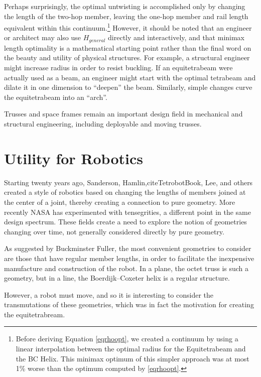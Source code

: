 \documentclass[11pt]{article}
\begin{document}
Perhaps surprisingly, the optimal untwisting is accomplished only by
changing the length of the two-hop member, leaving the one-hop member
and rail length equivalent within this continuum.\footnote{Before deriving Equation \eqref{eqrhoopt}, we created a continuum by
using a linear interpolation between the optimal radius for the
Equitetrabeam and the BC Helix. This minimax optimum of this simpler
approach was at most 1\% worse than the optimum computed by
\eqref{eqrhoopt}.}
 However, it should
be noted that an engineer or architect may also use $H_{general}$
directly and interactively, and that minimax length optimality is a
mathematical starting point rather than the final word on the beauty and utility of
physical structures. For example, a structural engineer might increase
radius in order to resist buckling. If an equitetrabeam were actually
used as a beam, an engineer might start with the optimal tetrabeam and
dilate it in one dimension to ``deepen'' the beam. Similarly, simple
changes curve the equitetrabeam into an ``arch''.

Trusses and space frames remain an important design field in
mechanical and structural engineering\cite{mikulas1985sequentially},
including deployable and moving trusses\cite{claypool2012readily}.


\section{Utility for Robotics}

Starting twenty years ago, Sanderson\cite{sanderson1996modular},
Hamlin,cite{TetrobotBook}, Lee\cite{lee2002dynamic}, and others
 created a style of robotics based on changing
the lengths of members joined at the center of a joint, thereby
creating a connection to pure geometry. More recently NASA has
experimented with tensegrities\cite{NTRT}, a different point in the
same design spectrum. These fields create a need to explore the notion
of geometries changing over time, not generally considered directly by
pure geometry.

As suggested by Buckminster Fuller, the most convenient geometries to
consider are those that have regular member lengths, in order to
facilitate the inexpensive manufacture and construction of the robot.
In a plane, the octet truss\cite{richard1961synergetic} is such a geometry, but in a line, the
Boerdijk--Coxeter helix is a regular structure.

However, a robot must move, and so it is interesting to consider the
transmutations of these geometries, which was in fact the motivation
for creating the equitetrabream.
\end{document}

